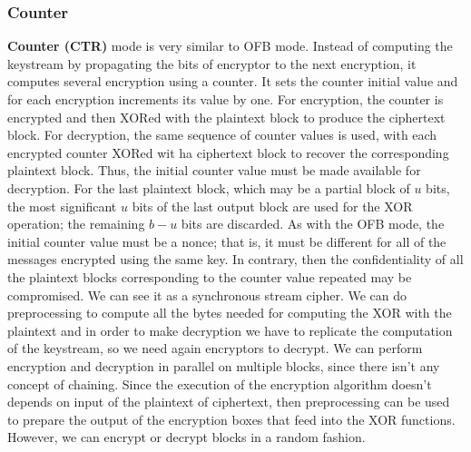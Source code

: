 \documentclass[11pt]{article}
\begin{document}
\subsubsection{Counter}
\textbf{Counter (CTR)} mode is very similar to OFB mode. Instead of computing the keystream by propagating the bits of encryptor to the next encryption, it computes several encryption using a counter. It sets the counter initial value and for each encryption increments its value by one. For encryption, the counter is encrypted and then XORed with the plaintext block to produce the ciphertext block. For decryption, the same sequence of counter values is used, with each encrypted counter XORed wit ha ciphertext block to recover the corresponding plaintext block. Thus, the initial counter value must be made available for decryption. For the last plaintext block, which may be a partial block of $u$ bits, the most significant $u$ bits of the last output block are used for the XOR operation; the remaining $b - u$ bits are discarded. As with the OFB mode, the initial counter value must be a nonce; that is, it must be different for all of the messages encrypted using the same key. In contrary, then the confidentiality of all the plaintext blocks corresponding to the counter value repeated may be compromised. We can see it as a synchronous stream cipher. We can do preprocessing to compute all the bytes needed for computing the XOR with the plaintext and in order to make decryption we have to replicate the computation of the keystream, so we need again encryptors to decrypt. We can perform encryption and decryption in parallel on multiple blocks, since there isn't any concept of chaining. Since the execution of the encryption algorithm doesn't depends on input of the plaintext of ciphertext, then preprocessing can be used to prepare the output of the encryption boxes that feed into the XOR functions. However, we can encrypt or decrypt blocks in a random fashion.
\end{document}

